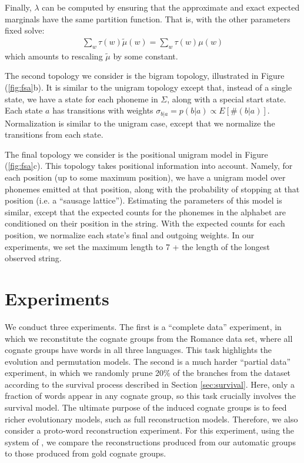 \documentclass[11pt,a4paper]{article}
\begin{document}
Finally, $\lambda$ can be computed by ensuring that the
approximate and exact expected marginals have the same partition
function. That is, with the other parameters fixed solve:
\begin{equation*}
  \begin{split}
    \sum_w \tau(w) \tilde\mu(w) = \sum_w \tau(w) \mu(w)
  \end{split}
\end{equation*}
which amounts to rescaling $\tilde\mu$ by some constant.

The second topology we consider is the bigram topology, illustrated
in Figure (\ref{fig:fsa}b). It is similar to the unigram topology
except that, instead of a single state, we have a state for each
phoneme in $\Sigma$, along with a special start state. Each state
$a$ has transitions with weights $\sigma_{b|a}= p(b|a) \propto
E[\#(b|a)]$.  Normalization is similar to the unigram case, except
that we normalize the transitions from each state.

The final topology we consider is the positional unigram model in
Figure (\ref{fig:fsa}c). This topology takes positional information
into account. Namely, for each position (up to some maximum position),
we have a unigram model over phonemes emitted at that position,
along with the probability of stopping at that position (i.e. a
``sausage lattice''). Estimating the parameters of this model is
similar, except that the expected counts for the phonemes in the
alphabet are conditioned on their position in the string. With the
expected counts for each position, we normalize each state's final
and outgoing weights. In our experiments, we set the maximum length
to 7 + the length of the longest observed string.

\section{Experiments}

We conduct three experiments. The first is a ``complete data''
experiment, in which we reconstitute the cognate groups from the
Romance data set, where all cognate groups have words in all three
languages.  This task highlights the evolution and permutation
models.  The second is a much harder ``partial data'' experiment,
in which we randomly prune 20\% of the branches from the dataset according to
the survival process described in Section \ref{sec:survival}.
Here, only a fraction of words appear in any cognate group,
so this task crucially involves the survival model.  The ultimate
purpose of the induced cognate groups is to feed richer evolutionary
models, such as full reconstruction models.  Therefore, we also
consider a proto-word reconstruction experiment.  For this experiment,
using the system of , we compare the
reconstructions produced from our automatic groups to those produced
from gold cognate groups.
\end{document}
